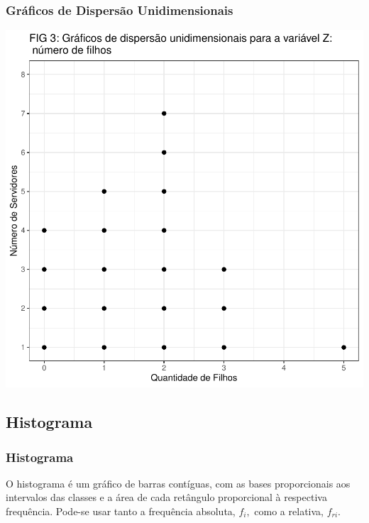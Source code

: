 \documentclass[14pt,aspectratio=1610]{beamer}
\begin{document}
\begin{frame}{}
\frametitle{Gráficos de Dispersão Unidimensionais}
\begin{block}{}
\begin{center}
\includegraphics{Aula5-point2}
\end{center}
\end{block}
\end{frame}


\subsection{Histograma}
\begin{frame}{}
\frametitle{Histograma}
\begin{block}{}
\justifying
O histograma é um gráfico de barras contíguas, com as bases proporcionais aos intervalos
das classes e a área de cada retângulo proporcional à respectiva frequência. Pode-se
usar tanto a frequência absoluta, $f_{i},$ como a relativa, $f_{ri}.$
\end{block}
\end{frame}
\end{document}
